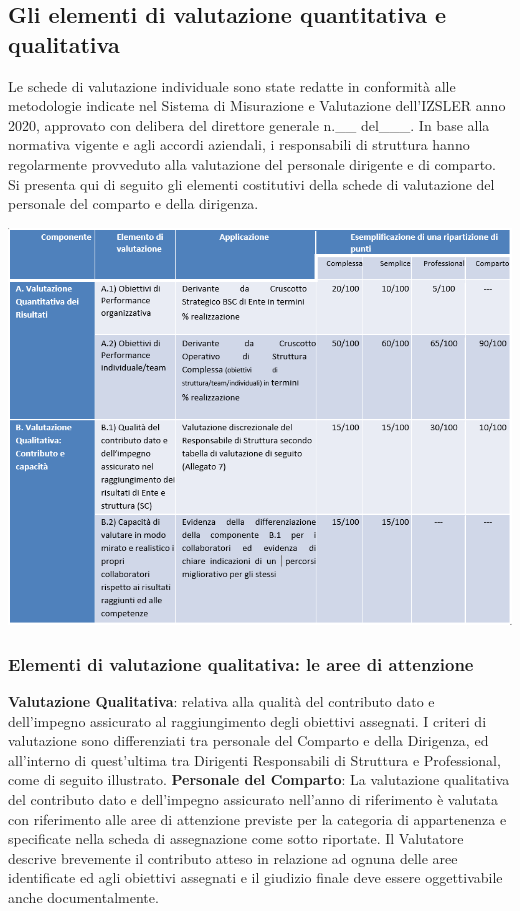 \documentclass[
  12pt,
]{article}
\begin{document}
\hypertarget{gli-elementi-di-valutazione-quantitativa-e-qualitativa}{%
\subsection{Gli elementi di valutazione quantitativa e
qualitativa}\label{gli-elementi-di-valutazione-quantitativa-e-qualitativa}}

Le schede di valutazione individuale sono state redatte in conformità
alle metodologie indicate nel Sistema di Misurazione e Valutazione
dell'IZSLER anno 2020, approvato con delibera del direttore generale
n.\_\_ del\_\_\_. In base alla normativa vigente e agli accordi
aziendali, i responsabili di struttura hanno regolarmente provveduto
alla valutazione del personale dirigente e di comparto. Si presenta qui
di seguito gli elementi costitutivi della schede di valutazione del
personale del comparto e della dirigenza.

\begin{center}\includegraphics[width=0.9\linewidth]{figure/f3} \end{center}

\hypertarget{elementi-di-valutazione-qualitativa-le-aree-di-attenzione}{%
\subsubsection{Elementi di valutazione qualitativa: le aree di
attenzione}\label{elementi-di-valutazione-qualitativa-le-aree-di-attenzione}}

\textbf{Valutazione Qualitativa}: relativa alla qualità del contributo
dato e dell'impegno assicurato al raggiungimento degli obiettivi
assegnati. I criteri di valutazione sono differenziati tra personale del
Comparto e della Dirigenza, ed all'interno di quest'ultima tra Dirigenti
Responsabili di Struttura e Professional, come di seguito illustrato.
\textbf{Personale del Comparto}: La valutazione qualitativa del
contributo dato e dell'impegno assicurato nell'anno di riferimento è
valutata con riferimento alle aree di attenzione previste per la
categoria di appartenenza e specificate nella scheda di assegnazione
come sotto riportate. Il Valutatore descrive brevemente il contributo
atteso in relazione ad ognuna delle aree identificate ed agli obiettivi
assegnati e il giudizio finale deve essere oggettivabile anche
documentalmente.
\end{document}
